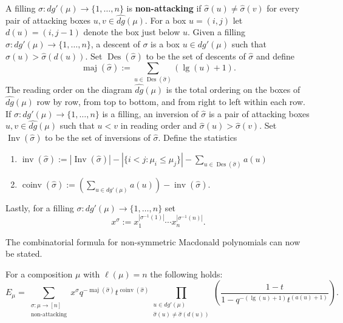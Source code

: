 \documentclass[ALCO,Unicode]{cedram}
\DeclareMathOperator{\Des}{Des}
\DeclareMathOperator{\maj}{maj}
\DeclareMathOperator{\Inv}{Inv}
\DeclareMathOperator{\inv}{inv}
\DeclareMathOperator{\coinv}{coinv}
\DeclareMathOperator{\mathleg}{lg}
\begin{document}
\begin{defi}
\begin{enumerate}
\end{enumerate}
A filling $\sigma: dg'(\mu) \rightarrow \{1,\ldots,n\}$ is \textbf{non-attacking} if $\widehat{\sigma}(u) \neq \widehat{\sigma}(v)$ for every pair of attacking boxes $u,v \in \widehat{dg}(\mu).$
For a box $u= (i,j)$ let $d(u) = (i,j-1)$ denote the box just below $u$. Given a filling $\sigma:dg'(\mu)\rightarrow \{1,\ldots,n\}$, a descent of $\sigma$ is a box $u \in dg'(\mu)$ such that $\widehat{\sigma}(u) > \widehat{\sigma}(d(u)).$
Set $\Des(\widehat{\sigma})$ to be the set of descents of $\widehat{\sigma}$ and define 
$$\maj(\widehat{\sigma}):= \sum_{u \in \Des(\widehat{\sigma})} (\mathleg(u)+1).$$
The reading order on the diagram $\widehat{dg}(\mu)$ is the total ordering on the boxes of $\widehat{dg}(\mu)$ row by row, from top to bottom, and from right to left within each row. If $\sigma: dg'(\mu) \rightarrow \{1,\ldots,n\}$ is a filling, an inversion of $\widehat{\sigma}$ is a pair of attacking boxes $u,v \in \widehat{dg}(\mu)$ such that $u < v$ in reading order and $\widehat{\sigma}(u) > \widehat{\sigma}(v).$ Set $\Inv(\widehat{\sigma})$ to be the set of inversions of $\widehat{\sigma}$. Define the statistics 
\begin{enumerate}
    \item $\inv(\widehat{\sigma}):= |\Inv(\widehat{\sigma})| -|\{i<j: \mu_i \leq \mu_j\}| - \sum_{u \in \Des(\widehat{\sigma})} a(u)$
    \item $\coinv(\widehat{\sigma}):= \left( \sum_{u \in dg'(\mu)} a(u) \right) -\inv(\widehat{\sigma}).$
    \end{enumerate}
Lastly, for a filling $\sigma:dg'(\mu) \rightarrow \{1,\ldots,n\}$ set $$x^{\sigma}:= x_1^{|\sigma^{-1}(1)|}\cdots x_n^{|\sigma^{-1}(n)|}.$$
\end{defi}

The combinatorial formula for non-symmetric Macdonald polynomials can now be stated.

\begin{thm} \label{HHL}
For a composition $\mu$ with $\ell(\mu) = n$ the following holds:
    $$E_{\mu} = \sum_{\substack{\sigma: \mu \rightarrow [n]\\ \text{non-attacking}}} x^{\sigma}q^{-\maj(\widehat{\sigma})}t^{\coinv(\widehat{\sigma})} \prod_{\substack{u \in dg'(\mu) \\ \widehat{\sigma}(u) \neq \widehat{\sigma}(d(u))}} \left( \frac{1-t}{1-q^{-(\mathleg(u)+1)}t^{(a(u)+1)}} \right). $$
\end{thm}
\end{document}
